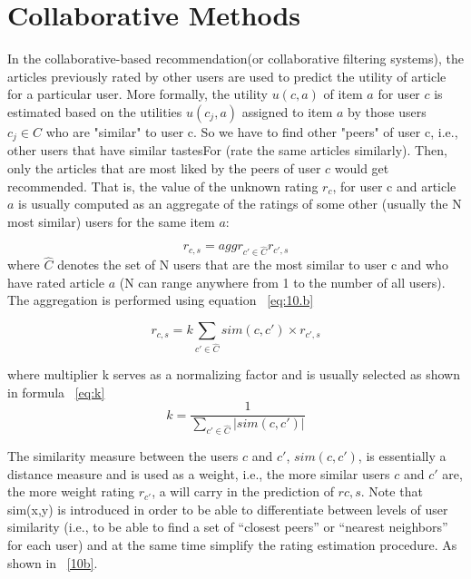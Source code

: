 \section{Collaborative Methods}
In the collaborative-based recommendation(or collaborative filtering systems), the articles previously rated by other users are used to predict the utility of article for a particular user. More formally, the utility $u(c, a)$ of item $a$ for user $c$ is estimated based on the utilities $u(c_j, a)$ assigned to item $a$ by those users $c_j \in C$ who are "similar" to user c. So we have to find other "peers" of user c, i.e., other users that have similar tastesFor (rate the same articles similarly). Then, only the articles that are most liked by the peers of user $c$ would get recommended. 
That is, the value of the unknown rating $r_c$, for user c and article $a$ is usually computed as an aggregate of the ratings of some other (usually the N most similar) users for the same item $a$:

\begin{equation}\label{eq:9}
r_{c,s}=aggr_{c'\in \hat{C}} r_{c',s} 
\end{equation}
where $\hat{C}$ denotes the set of N users that are the most similar to user c and who have rated article $a$ (N can range anywhere from 1 to the number of all users). The aggregation is performed using equation ~\ref{eq:10.b}


\begin{equation}\label{eq:10.b}
r_{c,s}= k\sum_{ c'\in \hat{C}} sim(c,c')\times r_{c',s}
\end{equation}


where multiplier k serves as a normalizing factor and is usually selected as shown in formula ~\ref{eq:k}
\begin{equation}\label{eq:k}
k = \frac{1}{\sum_{c' \in \hat{C}} |sim(c,c')|}
\end{equation}

The similarity measure between the users $c$ and $c'$, $sim(c, c')$, is essentially a distance measure and is used as a weight, i.e., the more similar users $c$ and $c'$ are, the more weight rating $r_{c'}$, a will carry in the prediction of $r{c,s}$. Note that sim(x,y) is introduced in order to be able to differentiate between levels of user similarity (i.e., to be able to find a set of “closest peers” or “nearest neighbors” for each user) and at the same time simplify the rating estimation procedure. As shown in ~\ref{10b}.




